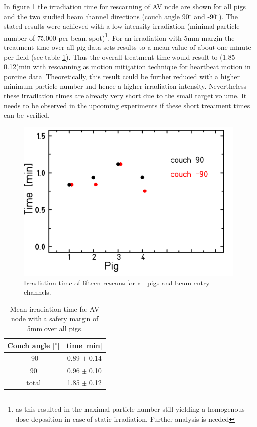 \documentclass[type=dr, dr=rernat, accentcolor=tud7b,colorbacktitle, bigchapter, openright, twoside, 12pt ]{tudthesis}
\begin{document}
In figure \ref{irrTime_rescan15} the irradiation time for rescanning of AV node are shown for all pigs and the two studied 
beam channel directions (couch angle 90$^{\circ}$ and -90$^{\circ}$). 
The stated results were achieved with a low intensity irradiation (minimal particle number of 75,000 per beam spot)\footnote{as this resulted 
in the maximal particle number still yielding a homogenous dose deposition in case of static irradiation. Further analysis is needed}. 
For an irradiation with 5mm margin 
the treatment time over all pig data sets results to a mean value of about one minute per field (see table \ref{tab:rescan_time:pigs}). 
Thus the overall treatment time would result to (1.85 $\pm$ 0.12)min with rescanning as motion mitigation technique for heartbeat motion 
in porcine data. Theoretically, this result could be further reduced with a higher minimum particle number and hence a higher irradiation 
intensity. Nevertheless these irradiation times are already very short due to the small target volume. It needs to be observed in 
the upcoming experiments if these short treatment times can be verified. 

\vspace*{0.5cm}

 \begin{figure}[H]
 \begin{center}
 \includegraphics[scale=0.2]{Rescan15_irrTime.png}
\caption{Irradiation time of fifteen rescans for all pigs and beam entry channels.}
\label{irrTime_rescan15}
 \end{center}
\end{figure}

\begin{table}[H]
  \centering
  \caption{Mean irradiation time for AV node with a safety margin of 5mm over all pigs.}
  \begin{tabular}{|c|c|}
    \hline\hline
    Couch angle [$^{\circ}$] & time [min] \\
    \hline
    -90 & 0.89 $\pm$ 0.14 \\
    90 & 0.96 $\pm$ 0.10 \\ \hline
    total & 1.85 $\pm$ 0.12 \\
    \hline\hline
    \end{tabular}
  \label{tab:rescan_time:pigs}
\end{table}
\end{document}

